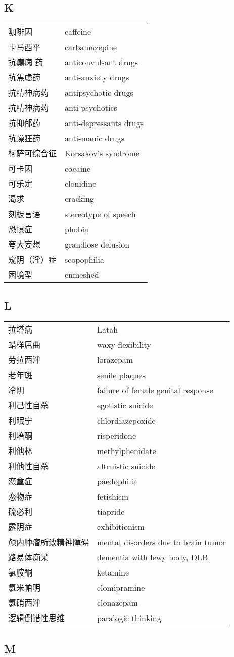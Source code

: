 \subsection*{K}

\begin{longtable}[]{@{}ll@{}}
\toprule
\endhead
咖啡因 & caffeine\tabularnewline
卡马西平 & carbamazepine\tabularnewline
抗癫痫 药 & anticonvulsant
drugs\tabularnewline
抗焦虑药 & anti-anxiety drugs\tabularnewline
抗精神病药 & antipsychotic drugs\tabularnewline
抗精神病药 & anti-psychotics\tabularnewline
抗抑郁药 & anti-depressants drugs\tabularnewline
抗躁狂药 & anti-manic drugs\tabularnewline
柯萨可综合征 & Korsakov's syndrome\tabularnewline
可卡因 & cocaine\tabularnewline
可乐定 & clonidine\tabularnewline
渴求 & cracking\tabularnewline
刻板言语 & stereotype of speech\tabularnewline
恐惧症 & phobia\tabularnewline
夸大妄想 & grandiose delusion\tabularnewline
窥阴（淫）症 & scopophilia\tabularnewline
困境型 & enmeshed\tabularnewline
\bottomrule
\end{longtable}

\subsection*{L}

\begin{longtable}[]{@{}ll@{}}
\toprule
\endhead
拉塔病 & Latah\tabularnewline
蜡样屈曲 & waxy flexibility\tabularnewline
劳拉西泮 & lorazepam\tabularnewline
老年斑 & senile plaques\tabularnewline
冷阴 & failure of female genital response\tabularnewline
利己性自杀 & egotistic suicide\tabularnewline
利眠宁 & chlordiazepoxide\tabularnewline
利培酮 & risperidone\tabularnewline
利他林 & methylphenidate\tabularnewline
利他性自杀 & altruistic suicide\tabularnewline
恋童症 & paedophilia\tabularnewline
恋物症 & fetishism\tabularnewline
硫必利 & tiapride\tabularnewline
露阴症 & exhibitionism\tabularnewline
颅内肿瘤所致精神障碍 & mental disorders due to brain
tumor\tabularnewline
路易体痴呆 & dementia with lewy body, DLB\tabularnewline
氯胺酮 & ketamine\tabularnewline
氯米帕明 & clomipramine\tabularnewline
氯硝西泮 & clonazepam\tabularnewline
逻辑倒错性思维 & paralogic thinking\tabularnewline
\bottomrule
\end{longtable}

\subsection*{M}

